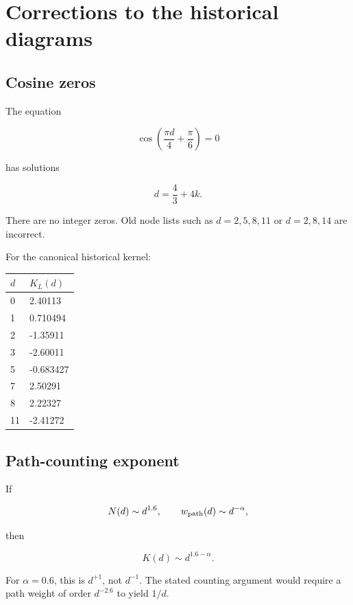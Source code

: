 \documentclass[11pt,a4paper,openany]{report}
\begin{document}
\section{Corrections to the historical diagrams}

\subsection{Cosine zeros}

The equation

\[
\cos\left(\frac{\pi d}{4}+\frac{\pi}{6}\right)=0
\]

has solutions

\[
d=\frac43+4k.
\]

There are no integer zeros. Old node lists such as \(d=2,5,8,11\) or \(d=2,8,14\) are incorrect.

For the canonical historical kernel:

\begin{center}
\begingroup\small
\setlength{\tabcolsep}{2.5pt}
\renewcommand{\arraystretch}{1.16}
\begin{longtable}{@{}p{}p{}@{}}
\toprule
\textbf{\(d\)} & \textbf{\(K_L(d)\)} \\
\midrule
\endhead
0 & 2.40113 \\
1 & 0.710494 \\
2 & -1.35911 \\
3 & -2.60011 \\
5 & -0.683427 \\
7 & 2.50291 \\
8 & 2.22327 \\
11 & -2.41272 \\
\bottomrule
\end{longtable}
\endgroup
\end{center}

\subsection{Path-counting exponent}

If

\[
N(d)\sim d^{1.6},
\qquad
w_{\rm path}(d)\sim d^{-\alpha},
\]

then

\[
K(d)\sim d^{1.6-\alpha}.
\]

For \(\alpha=0.6\), this is \(d^{+1}\), not \(d^{-1}\). The stated counting argument would require a path weight of order \(d^{-2.6}\) to yield \(1/d\).
\end{document}
